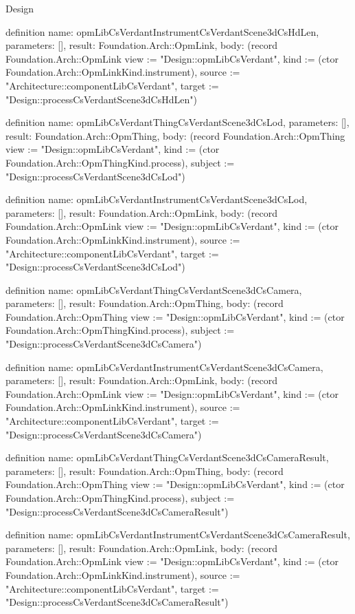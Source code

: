 \begin{lexlean}{Design}
\begin{semanticmodule}
definition{
  name: opmLibCsVerdantInstrumentCsVerdantScene3dCsHdLen,
  parameters: [],
  result: Foundation.Arch::OpmLink,
  body: (record Foundation.Arch::OpmLink {view := "Design::opmLibCsVerdant", kind := (ctor Foundation.Arch::OpmLinkKind.instrument), source := "Architecture::componentLibCsVerdant", target := "Design::processCsVerdantScene3dCsHdLen"})
}

definition{
  name: opmLibCsVerdantThingCsVerdantScene3dCsLod,
  parameters: [],
  result: Foundation.Arch::OpmThing,
  body: (record Foundation.Arch::OpmThing {view := "Design::opmLibCsVerdant", kind := (ctor Foundation.Arch::OpmThingKind.process), subject := "Design::processCsVerdantScene3dCsLod"})
}

definition{
  name: opmLibCsVerdantInstrumentCsVerdantScene3dCsLod,
  parameters: [],
  result: Foundation.Arch::OpmLink,
  body: (record Foundation.Arch::OpmLink {view := "Design::opmLibCsVerdant", kind := (ctor Foundation.Arch::OpmLinkKind.instrument), source := "Architecture::componentLibCsVerdant", target := "Design::processCsVerdantScene3dCsLod"})
}

definition{
  name: opmLibCsVerdantThingCsVerdantScene3dCsCamera,
  parameters: [],
  result: Foundation.Arch::OpmThing,
  body: (record Foundation.Arch::OpmThing {view := "Design::opmLibCsVerdant", kind := (ctor Foundation.Arch::OpmThingKind.process), subject := "Design::processCsVerdantScene3dCsCamera"})
}

definition{
  name: opmLibCsVerdantInstrumentCsVerdantScene3dCsCamera,
  parameters: [],
  result: Foundation.Arch::OpmLink,
  body: (record Foundation.Arch::OpmLink {view := "Design::opmLibCsVerdant", kind := (ctor Foundation.Arch::OpmLinkKind.instrument), source := "Architecture::componentLibCsVerdant", target := "Design::processCsVerdantScene3dCsCamera"})
}

definition{
  name: opmLibCsVerdantThingCsVerdantScene3dCsCameraResult,
  parameters: [],
  result: Foundation.Arch::OpmThing,
  body: (record Foundation.Arch::OpmThing {view := "Design::opmLibCsVerdant", kind := (ctor Foundation.Arch::OpmThingKind.process), subject := "Design::processCsVerdantScene3dCsCameraResult"})
}

definition{
  name: opmLibCsVerdantInstrumentCsVerdantScene3dCsCameraResult,
  parameters: [],
  result: Foundation.Arch::OpmLink,
  body: (record Foundation.Arch::OpmLink {view := "Design::opmLibCsVerdant", kind := (ctor Foundation.Arch::OpmLinkKind.instrument), source := "Architecture::componentLibCsVerdant", target := "Design::processCsVerdantScene3dCsCameraResult"})
}


\end{semanticmodule}
\end{lexlean}

